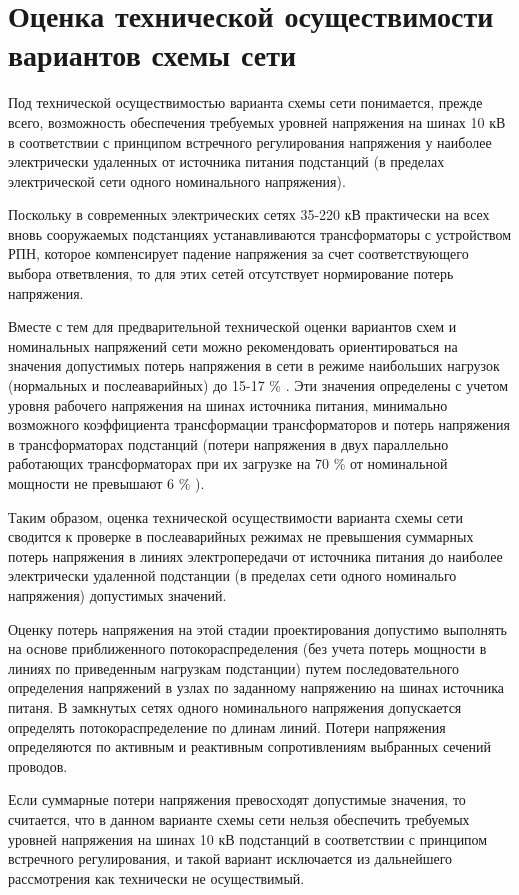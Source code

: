 \chapter{Оценка технической осуществимости вариантов схемы сети}

Под технической осуществимостью варианта схемы сети понимается, прежде всего, возможность обеспечения требуемых уровней напряжения на шинах 10 кВ в соответствии с принципом встречного регулирования напряжения у наиболее электрически удаленных от источника питания подстанций (в пределах электрической сети одного номинального напряжения).

Поскольку в современных электрических сетях 35-220 кВ практически на всех вновь сооружаемых подстанциях устанавливаются трансформаторы с устройством РПН, которое компенсирует падение напряжения за счет соответствующего выбора ответвления, то для этих сетей отсутствует нормирование потерь напряжения.

Вместе с тем для предварительной технической оценки вариантов схем и номинальных напряжений сети можно рекомендовать ориентироваться на значения допустимых потерь напряжения в сети в режиме наибольших нагрузок (нормальных и послеаварийных) до 15-17 \% \cite{глазунов_шведов}. Эти значения определены с учетом уровня рабочего напряжения на шинах источника питания, минимально возможного коэффициента трансформации трансформаторов и потерь напряжения в трансформаторах подстанций (потери напряжения в двух параллельно работающих трансформаторах при их загрузке на 70 \% от номинальной мощности не превышают 6 \% \cite{глазунов_шведов}).

Таким образом, оценка технической осуществимости варианта схемы сети сводится к проверке в послеаварийных режимах не превышения суммарных потерь напряжения в линиях электропередачи от источника питания до наиболее электрически удаленной подстанции (в пределах сети одного номинальго напряжения) допустимых значений.

Оценку потерь напряжения на этой стадии проектирования допустимо выполнять на основе приближенного потокораспределения (без учета потерь мощности в линиях по приведенным нагрузкам подстанции) путем последовательного определения напряжений в узлах по заданному напряжению на шинах источника питаня. В замкнутых сетях одного номинального напряжения допускается определять потокораспределение по длинам линий. Потери напряжения определяются по активным и реактивным сопротивлениям выбранных сечений проводов.

Если суммарные потери напряжения превосходят допустимые значения, то считается, что в данном варианте схемы сети нельзя обеспечить требуемых уровней напряжения на шинах 10 кВ подстанций в соответствии с принципом встречного регулирования, и такой вариант исключается из дальнейшего рассмотрения как технически не осуществимый.

